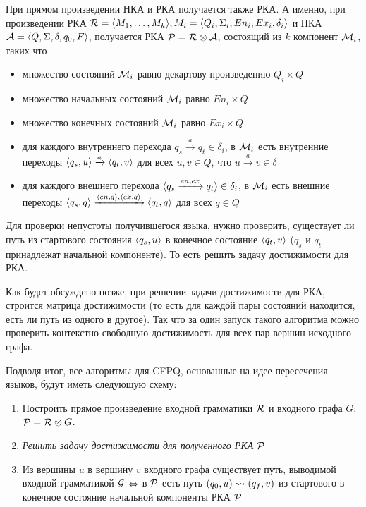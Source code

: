 При прямом произведении НКА и РКА получается также РКА. А именно, при произведении РКА $\mathcal{R} = \langle M_1, \dots, M_k \rangle,  M_i = \langle Q_i, \Sigma_i, En_i, Ex_i, \delta_i \rangle$ и НКА $\mathcal{A} = \langle Q, \Sigma, \delta, q_0, F \rangle$, получается РКА $\mathcal{P} = \mathcal{R} \otimes \mathcal{A}$, состоящий из $k$ компонент $\mathcal{M}_i$, таких что
  \vspace{-\topsep}
  \begin{itemize}
    \setlength\itemsep{-0.1em}
    \item множество состояний $\mathcal{M}_i$ равно декартову произведению $Q_i \times Q$
    \item множество начальных состояний $\mathcal{M}_i$ равно $En_i \times Q$
    \item множество конечных  состояний $\mathcal{M}_i$ равно $Ex_i \times Q$
    \item для каждого внутреннего перехода $q_s \xrightarrow{a} q_t \in \delta_i$, в $\mathcal{M}_i$ есть внутренние переходы $\langle q_s, u \rangle \xrightarrow{a} \langle q_t, v \rangle$ для всех $u, v \in Q$, что $u \xrightarrow{a} v \in \delta$
    \item для каждого внешнего перехода $\langle q_s \xrightarrow{en, ex} q_t \rangle \in \delta_i$, в $\mathcal{M}_i$ есть внешние переходы $\langle q_s, q \rangle \xrightarrow{\langle en, q \rangle, \langle ex, q \rangle} \langle q_t, q \rangle$ для всех $q \in Q$
  \end{itemize}

Для проверки непустоты получившегося языка, нужно проверить, существует ли путь из стартового состояния $\langle q_s, u \rangle$ в конечное состояние $\langle q_t, v \rangle$ ($q_s$ и $q_t$ принадлежат начальной компоненте). То есть решить задачу достижимости для РКА.

Как будет обсуждено позже, при решении задачи достижимости для РКА, строится матрица достижимости (то есть для каждой пары состояний находится, есть ли путь из одного в другое). Так что за один запуск такого алгоритма можно проверить контекстно-свободную достижимость для всех пар вершин исходного графа. 

Подводя итог, все алгоритмы для CFPQ, основанные на идее пересечения языков, будут иметь следующую схему:
\begin{enumerate}
    \item Построить прямое произведение входной грамматики $\mathcal{R}$ и входного графа $G$: $\mathcal{P} = \mathcal{R} \otimes G$.
    \item \textit{Решить задачу достижимости для полученного РКА $\mathcal{P}$}
    \item Из вершины $u$ в вершину $v$ входного графа существует путь, выводимой входной грамматикой $\mathcal{G}$ $\Leftrightarrow$ в $\mathcal{P}$ есть путь $(q_0, u) \rightsquigarrow (q_f, v)$ из стартового в конечное состояние начальной компоненты РКА $\mathcal{P}$
\end{enumerate}

